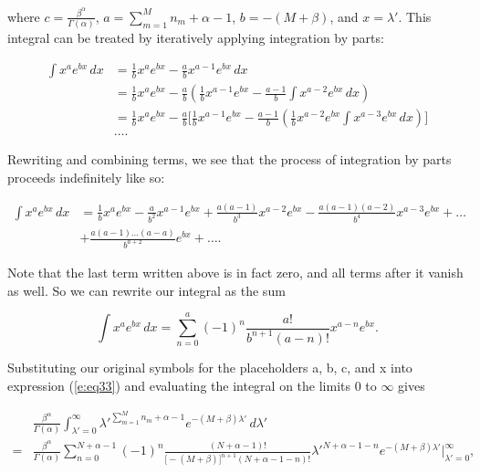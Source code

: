 \documentclass[12pt]{article}
\begin{document}
where $c = \frac{\beta^{\alpha}}{\Gamma(\alpha)}$, $a = \sum_{m = 1}^{M} n_m + \alpha - 1$, $b = -(M + \beta)$, and $x = \lambda'$. This integral can be treated by iteratively applying integration by parts:

\begin{align}
\int x^a e^{bx} \, dx &= \frac{1}{b} x^a e^{bx} - \frac{a}{b} x^{a - 1} e^{bx} \, dx \\[5pt]
&= \frac{1}{b} x^a e^{bx} - \frac{a}{b}(\frac{1}{b} x^{a - 1} e^{bx} - \frac{a - 1}{b}\int x^{a - 2} e^{bx} \, dx) \\[5pt]
&= \frac{1}{b} x^a e^{bx} - \frac{a}{b}\Big[\frac{1}{b} x^{a - 1} e^{bx} - \frac{a - 1}{b}(\frac{1}{b} x^{a - 2} e^{bx} \int x^{a - 3} e^{bx} \, dx)\Big] \\[5pt]
&\ldots.  \nonumber
\end{align}

Rewriting and combining terms, we see that the process of integration by parts proceeds indefinitely like so:

\begin{align}
\int x^a e^{bx} \, dx &= \frac{1}{b} x^a e^{bx} - \frac{a}{b^2} x^{a - 1} e^{bx} + \frac{a(a - 1)}{b^3} x^{a - 2} e^{bx} - \frac{a(a - 1)(a - 2)}{b^4} x^{a - 3} e^{bx} + \ldots \nonumber \\[5pt]
&+ \frac{a(a - 1) \ldots (a - a)}{b^{a + 2}} e^{bx} + \ldots.
\end{align}

Note that the last term written above is in fact zero, and all terms after it vanish as well. So we can rewrite our integral as the sum

\begin{equation}
\int x^a e^{bx} \, dx = \sum_{n = 0}^{a} (-1)^n \frac{a!}{b^{n + 1} (a - n)!} x^{a - n} e^{bx}.
\end{equation}

Substituting our original symbols for the placeholders a, b, c, and x into expression (\ref{e:eq33}) and evaluating the integral on the limits 0 to $\infty$ gives

\begin{align}
\label{e:eq39}
&\frac{\beta^{\alpha}}{\Gamma(\alpha)} \int_{\lambda' = 0}^{\infty} \lambda'^{\sum_{m = 1}^{M} n_m + \alpha - 1} e^{-(M + \beta) \lambda'} \, d\lambda' \nonumber \\[5pt]
= &\frac{\beta^{\alpha}}{\Gamma(\alpha)} \sum_{n = 0}^{N + \alpha - 1} (-1)^n \frac{(N + \alpha - 1)!}{\Big[-(M + \beta)\Big]^{n + 1} (N + \alpha - 1 - n)!} \lambda'^{N + \alpha - 1 - n} e^{-(M + \beta)\lambda'}\Big|_{\lambda' = 0}^{\infty},
\end{align}
\end{document}
